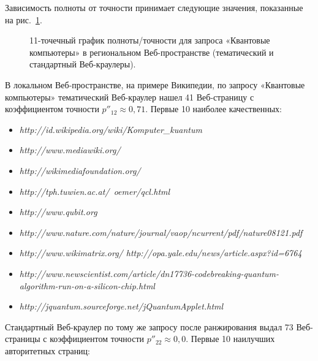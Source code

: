 Зависимость полноты от точности принимает следующие значения, показанные на рис.~\cref{fig:quantumComputerRegoinalPR}.

\begin{figure}[ht]
	\caption{11-точечный график полноты/точности для запроса «Квантовые компьютеры» в региональном Веб-пространстве (тематический и стандартный Веб-краулеры).}\label{fig:quantumComputerRegoinalPR}
\end{figure}

В локальном Веб-пространстве, на примере Википедии, по запросу «Квантовые компьютеры» тематический Веб-краулер нашел 41 Веб-страницу с коэффициентом точности \(p''_{12} \approx 0,71\). Первые 10 наиболее качественных:

\begin{itemize}
	\item \textit{http://id.wikipedia.org/wiki/Komputer\_kuantum}
	\item \textit{http://www.mediawiki.org/} 
	\item \textit{http://wikimediafoundation.org/}
	\item \textit{http://tph.tuwien.ac.at/~oemer/qcl.html}
	\item \textit{http://www.qubit.org}
	\item \textit{http://www.nature.com/nature/journal/vaop/ncurrent/pdf/nature08121.pdf} 
	\item \textit{http://www.wikimatrix.org/ http://opa.yale.edu/news/article.aspx?id=6764}
	\item \textit{http://www.newscientist.com/article/dn17736-codebreaking-\linebreak quantum-algorithm-run-on-a-silicon-chip.html}
	\item \textit{http://jquantum.sourceforge.net/jQuantumApplet.html}
\end{itemize}

Стандартный Веб-краулер по тому же запросу после ранжирования выдал 73 Веб-страницы с коэффициентом точности \(p''_{22} \approx 0,0\). Первые 10 наилучших авторитетных страниц:

